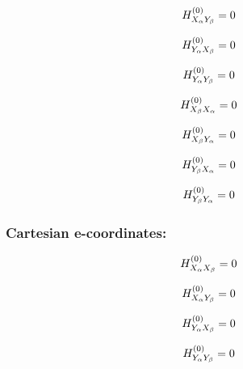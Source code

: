 \documentclass[fleqn]{article}
\begin{document}
\begin{dmath*}
H_{X_{\alpha}Y_{\beta}}^{(0)}=0\\
\end{dmath*}

\begin{dmath*}
H_{Y_{\alpha}X_{\beta}}^{(0)}=0\\
\end{dmath*}

\begin{dmath*}
H_{Y_{\alpha}Y_{\beta}}^{(0)}=0\\
\end{dmath*}

\begin{dmath*}
H_{X_{\beta}X_{\alpha}}^{(0)}=0\\
\end{dmath*}

\begin{dmath*}
H_{X_{\beta}Y_{\alpha}}^{(0)}=0\\
\end{dmath*}

\begin{dmath*}
H_{Y_{\beta}X_{\alpha}}^{(0)}=0\\
\end{dmath*}

\begin{dmath*}
H_{Y_{\beta}Y_{\alpha}}^{(0)}=0\\
\end{dmath*}
\subsubsection*{Cartesian e-coordinates:}

\begin{dmath*}
H_{X_{\alpha}X_{\beta}}^{(0)}=0\\
\end{dmath*}

\begin{dmath*}
H_{X_{\alpha}Y_{\beta}}^{(0)}=0\\
\end{dmath*}

\begin{dmath*}
H_{Y_{\alpha}X_{\beta}}^{(0)}=0\\
\end{dmath*}

\begin{dmath*}
H_{Y_{\alpha}Y_{\beta}}^{(0)}=0\\
\end{dmath*}
\end{document}
